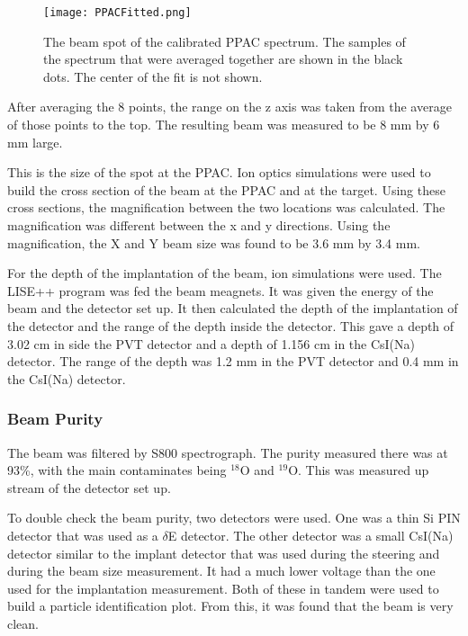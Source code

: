 \begin{figure}
	\texttt{[image: PPACFitted.png]}
	\caption{The beam spot of the calibrated PPAC spectrum. 
		 The samples of the spectrum that were averaged together are shown in the black dots.
		 The center of the fit is not shown.}
	\label{fig:PPACSpotch}
\end{figure}  

After averaging the 8 points, the range on the z axis was taken from the average of those points to the top.
The resulting beam was measured to be 8 mm by 6 mm large.

This is the size of the spot at the PPAC. 
Ion optics simulations were used to build the cross section of the beam at the PPAC and at the target.
Using these cross sections, the magnification between the two locations was calculated.
The magnification was different between the x and y directions.
Using the magnification, the X and Y beam size was found to be 3.6 mm by 3.4 mm.

For the depth of the implantation of the beam, ion simulations were used.
The LISE++ program was fed the beam meagnets.
It was given the energy of the beam and the detector set up.
It then calculated the depth of the implantation of the detector and the range of the depth inside the detector.
This gave a depth of 3.02 cm in side the PVT detector and a depth of 1.156 cm in the CsI(Na) detector.
The range of the depth was 1.2 mm in the PVT detector and 0.4 mm in the CsI(Na) detector. 

\subsubsection{Beam Purity}
The beam was filtered by S800 spectrograph.
The purity measured there was at 93\%, with the main contaminates being $^{18}$O and $^{19}$O.
This was measured up stream of the detector set up. 

To double check the beam purity, two detectors were used.
One was a thin Si PIN detector that was used as a $\delta$E detector.
The other detector was a small CsI(Na) detector similar to the implant detector that was used during the steering and during the beam size measurement. 
It had a much lower voltage than the one used for the implantation measurement.
Both of these in tandem were used to build a particle identification plot.
From this, it was found that the beam is very clean.

